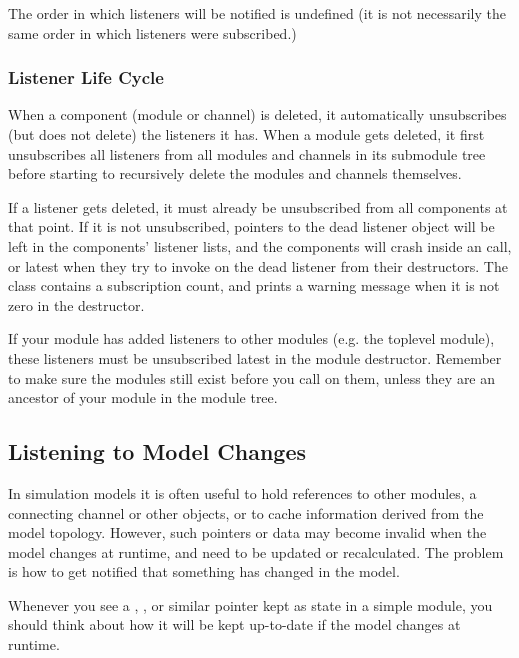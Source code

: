 The order in which listeners will be notified is undefined (it is not necessarily
the same order in which listeners were subscribed.)

\subsubsection{Listener Life Cycle}
\label{sec:simple-modules:signals:life-cycle}

When a component (module or channel) is deleted, it automatically
unsubscribes (but does not delete) the listeners it has. When a
module gets deleted, it first unsubscribes all listeners from all
modules and channels in its submodule tree before starting
to recursively delete the modules and channels themselves.

If a listener gets deleted, it must already be unsubscribed from all
components at that point. If it is not unsubscribed, pointers to the dead
listener object will be left in the components' listener lists, and the
components will crash inside an  call, or latest when they
try to invoke  on the dead listener from their
destructors. The  class contains a subscription count,
and prints a warning message when it is not zero in the destructor.

\begin{note}
  If your module has added listeners to other modules (e.g. the toplevel
  module), these listeners must be unsubscribed latest in the module
  destructor. Remember to make sure the modules still exist before you
  call  on them, unless they are an ancestor
  of your module in the module tree.
\end{note}


\subsection{Listening to Model Changes}
\label{sec:ch-simple-modules:model-change}

In simulation models it is often useful to hold references to other
modules, a connecting channel or other objects, or to cache information
derived from the model topology. However, such pointers or data may
become invalid when the model changes at runtime, and need to be updated
or recalculated. The problem is how to get notified that something has
changed in the model.

\begin{note}
  Whenever you see a , ,  or
  similar pointer kept as state in a simple module, you should think about
  how it will be kept up-to-date if the model changes at runtime.
\end{note}

